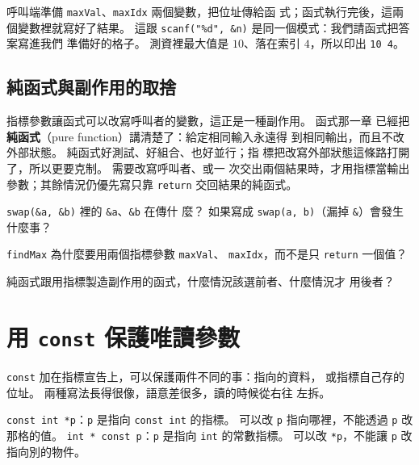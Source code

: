 
呼叫端準備 \texttt{maxVal}、\texttt{maxIdx} 兩個變數，把位址傳給函
式；函式執行完後，這兩個變數裡就寫好了結果。 這跟
\texttt{scanf("\%d", \&n)} 是同一個模式：我們請函式把答案寫進我們
準備好的格子。 測資裡最大值是 $10$、落在索引 $4$，所以印出
\texttt{10 4}。

\subsection{純函式與副作用的取捨}

指標參數讓函式可以改寫呼叫者的變數，這正是一種副作用。 函式那一章
已經把\textbf{純函式}（pure function）講清楚了：給定相同輸入永遠得
到相同輸出，而且不改外部狀態。 純函式好測試、好組合、也好並行；指
標把改寫外部狀態這條路打開了，所以更要克制。 需要改寫呼叫者、或一
次交出兩個結果時，才用指標當輸出參數；其餘情況仍優先寫只靠
\texttt{return} 交回結果的純函式。


\begin{drills}[label=drills:ptr-params]
\item \texttt{swap(\&a, \&b)} 裡的 \texttt{\&a}、\texttt{\&b} 在傳什
麼？ 如果寫成 \texttt{swap(a, b)}（漏掉 \texttt{\&}）會發生什麼事？
\item \texttt{findMax} 為什麼要用兩個指標參數 \texttt{maxVal}、
\texttt{maxIdx}，而不是只 \texttt{return} 一個值？
\item 純函式跟用指標製造副作用的函式，什麼情況該選前者、什麼情況才
用後者？
\end{drills}

\section{用 \texttt{const} 保護唯讀參數}
\label{sec:ptr-const}

\texttt{const} 加在指標宣告上，可以保護兩件不同的事：指向的資料，
或指標自己存的位址。 兩種寫法長得很像，語意差很多，讀的時候從右往
左拆。

\texttt{const int *p}：\texttt{p} 是指向 \texttt{const int} 的指標。
可以改 \texttt{p} 指向哪裡，不能透過 \texttt{p} 改那格的值。
\texttt{int * const p}：\texttt{p} 是指向 \texttt{int} 的常數指標。
可以改 \texttt{*p}，不能讓 \texttt{p} 改指向別的物件。


